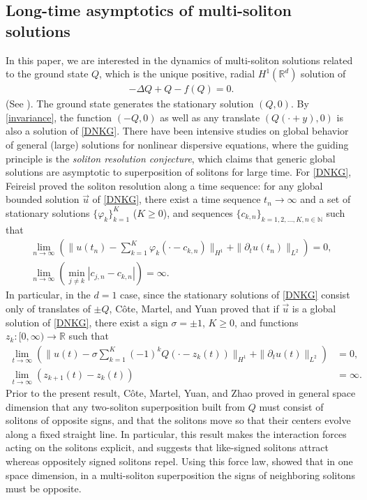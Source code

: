 \documentclass[reqno]{amsart}
\theoremstyle{plain}
\theoremstyle{definition}
\numberwithin{equation}{section}
\newcommand{\1}{\mathbbm{1}}
\begin{document}
\subsection{Long-time asymptotics of multi-soliton solutions}
 In this paper, we are interested in the dynamics of multi-soliton solutions related to the ground state $Q$, which is the unique positive, radial $H^1(\mathbb{R}^d)$ solution of 
\begin{align}\label{Qode}
-\Delta Q+Q-f(Q)=0.
\end{align}
(See \cite{K2}). The ground state generates the stationary solution $(Q,0)$. By \eqref{invariance}, the function $(-Q,0)$ as well as any translate $(Q(\cdot+y),0)$ is also a solution of \eqref{DNKG}. There have been intensive studies on global behavior of general (large) solutions for nonlinear dispersive equations, where the guiding principle is the \textit{soliton resolution conjecture}, which claims that generic global solutions are asymptotic to superposition of solitons for large time. For \eqref{DNKG}, Feireisl \cite{F} proved the soliton resolution along a time sequence: for any global bounded solution $\vec{u}$ of \eqref{DNKG}, there exist a time sequence $t_n\to \infty$ and a set of stationary solutions $\{ \varphi_k\}_{k=1}^K$ ($K\geq 0$), and sequences $\{ c_{k,n}\}_{k=1,2,\ldots, K,n\in \mathbb{N}}$ such that
\begin{align*}
\lim_{n\to\infty} \left( \|u(t_n)-\sum_{k=1}^K\varphi_k(\cdot -c_{k,n})\|_{H^1}+\|{\partial}_tu(t_n)\|_{L^2}\right)=0,
\\
\lim_{n\to\infty} \left(\min_{j\neq k} |c_{j,n}-c_{k,n}|\right)=\infty.
\end{align*}
In particular, in the $d=1$ case, since the stationary solutions of \eqref{DNKG} consist only of translates of $\pm Q$, C\^{o}te, Martel, and Yuan \cite{CMY} proved that if $\vec{u}$ is a global solution of \eqref{DNKG}, there exist a sign $\sigma=\pm 1$, $K\geq 0$, and functions $z_k:[0,\infty)\to \mathbb{R}$ such that 
\begin{align*}
\lim_{t\to\infty} \left(\| u(t)-\sigma \sum_{k=1}^K (-1)^kQ(\cdot-z_k(t))\|_{H^1}+\|{\partial}_tu(t)\|_{L^2}\right)&=0,
\\
\lim_{t\to\infty} \left(z_{k+1}(t)-z_k(t)\right)&=\infty.
\end{align*}
Prior to the present result, C\^{o}te, Martel, Yuan, and Zhao \cite{CMYZ} proved in general space dimension that any two-soliton superposition built from $Q$ must consist of solitons of opposite signs, and that the solitons move so that their centers evolve along a fixed straight line. In particular, this result makes the interaction forces acting on the solitons explicit, and suggests that like-signed solitons attract whereas oppositely signed solitons repel. Using this force law, \cite{CMY} showed that in one space dimension, in a multi-soliton superposition the signs of neighboring solitons must be opposite.
\end{document}
